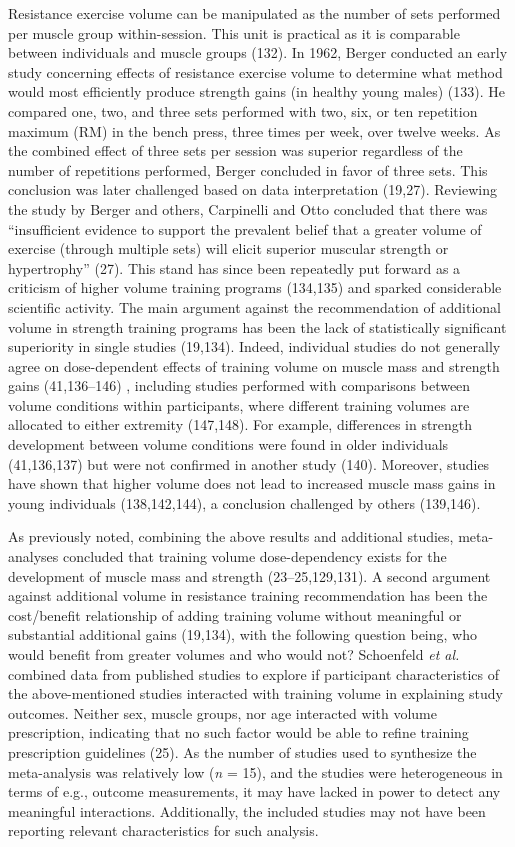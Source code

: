 \documentclass[twoside,10pt]{gihclass} %
\begin{document}
Resistance exercise volume can be manipulated as the number of sets performed per muscle group within-session. This unit is practical as it is comparable between individuals and muscle groups (132).
In 1962, Berger conducted an early study concerning effects of resistance exercise volume to determine what method would most efficiently produce strength gains (in healthy young males) (133). He compared one, two, and three sets performed with two, six, or ten repetition maximum (RM) in the bench press, three times per week, over twelve weeks. As the combined effect of three sets per session was superior regardless of the number of repetitions performed, Berger concluded in favor of three sets. This conclusion was later challenged based on data interpretation
(19,27).
Reviewing the study by Berger and others, Carpinelli and Otto concluded that there was ``insufficient evidence to support the prevalent belief that a greater volume of exercise (through multiple sets) will elicit superior muscular strength or hypertrophy'' (27). This stand has since been repeatedly put forward as a criticism of higher volume training programs
(134,135) and sparked considerable scientific activity.
The main argument against the recommendation of additional volume in strength training programs has been the lack of statistically significant superiority in single studies (19,134).
Indeed, individual studies do not generally agree on dose-dependent effects of training volume on muscle mass and strength gains
(41,136--146)
,
including studies performed with comparisons between volume conditions within participants, where different training volumes are allocated to either extremity
(147,148).
For example, differences in strength development between volume conditions were found in older individuals
(41,136,137)
but were not confirmed in another study
(140).
Moreover, studies have shown that higher volume does not lead to increased muscle mass gains in young individuals
(138,142,144),
a conclusion challenged by others
(139,146).

As previously noted, combining the above results and additional studies, meta-analyses concluded that training volume dose-dependency exists for the development of muscle mass and strength
(23--25,129,131).
A second argument against additional volume in resistance training recommendation has been the cost/benefit relationship of adding training volume without meaningful or substantial additional gains
(19,134),
with the following question being, who would benefit from greater volumes and who would not?
Schoenfeld \emph{et al.} combined data from published studies to explore if participant characteristics of the above-mentioned studies interacted with training volume in explaining study outcomes. Neither sex, muscle groups, nor age interacted with volume prescription, indicating that no such factor would be able to refine training prescription guidelines
(25).
As the number of studies used to synthesize the meta-analysis was relatively low (\emph{n} = 15), and the studies were heterogeneous in terms of e.g., outcome measurements, it may have lacked in power to detect any meaningful interactions. Additionally, the included studies may not have been reporting relevant characteristics for such analysis.
\end{document}
